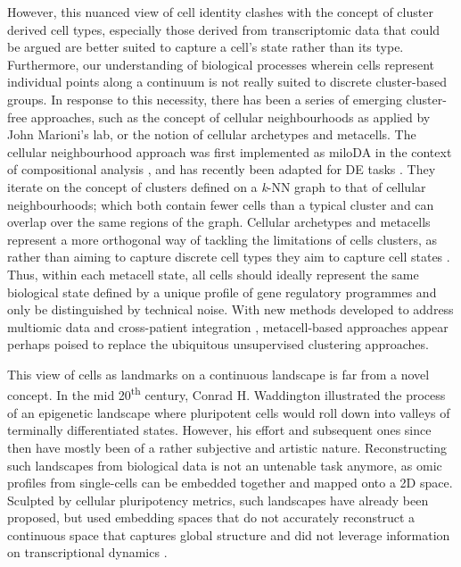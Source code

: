However, this nuanced view of cell identity clashes with the concept of cluster derived cell types, especially those derived from transcriptomic data that could be argued are better suited to capture a cell's state rather than its type. Furthermore, our understanding of biological processes wherein cells represent individual points along a continuum is not really suited to discrete cluster-based groups. In response to this necessity, there has been a series of emerging cluster-free approaches, such as the concept of cellular neighbourhoods as applied by John Marioni's lab, or the notion of cellular archetypes and metacells. The cellular neighbourhood approach was first implemented as miloDA in the context of compositional analysis \cite{dann_differential_2022}, and has recently been adapted for DE tasks \cite{missarova_sensitive_2023}. They iterate on the concept of clusters defined on a \textit{k}-NN graph to that of cellular neighbourhoods; which both contain fewer cells than a typical cluster and can overlap over the same regions of the graph. Cellular archetypes and metacells represent a more orthogonal way of tackling the limitations of cells clusters, as rather than aiming to capture discrete cell types they aim to capture cell states \cite{baran_metacell_2019, wang_non-linear_2022}. Thus, within each metacell state, all cells should ideally represent the same biological state defined by a unique profile of gene regulatory programmes and only be distinguished by technical noise. With new methods developed to address multiomic data and cross-patient integration \cite{persad_seacells_2023}, metacell-based approaches appear perhaps poised to replace the ubiquitous unsupervised clustering approaches.  

This view of cells as landmarks on a continuous landscape is far from a novel concept. In the mid 20\textsuperscript{th} century, Conrad H. Waddington illustrated the process of an epigenetic landscape where pluripotent cells would roll down into valleys of terminally differentiated states\cite{ch_waddington_waddington_1957}. However, his effort and subsequent ones since then have mostly been of a rather subjective and artistic nature. Reconstructing such landscapes from biological data is not an untenable task anymore, as omic profiles from single-cells can be embedded together and mapped onto a 2D space. Sculpted by cellular pluripotency metrics, such landscapes have already been proposed, but used embedding spaces that do not accurately reconstruct a continuous space that captures global structure and did not leverage information on transcriptional dynamics \cite{chen_single-cell_2019}. 

